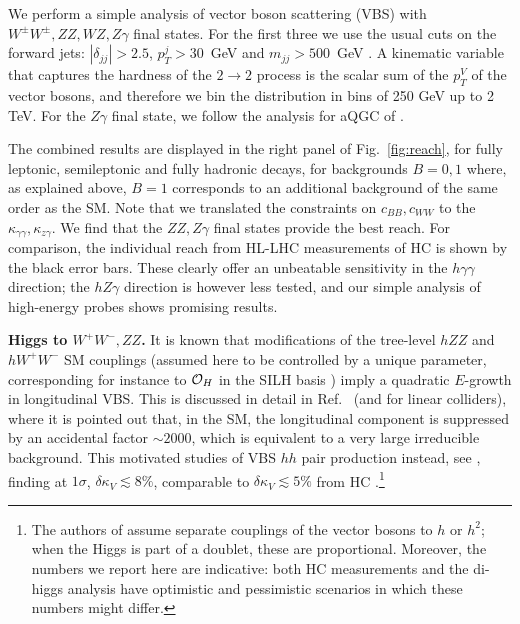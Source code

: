 We perform a simple analysis of vector boson scattering (VBS) with $W^\pm W^\pm, ZZ, WZ,Z\gamma$ final states. For the first three we use the usual cuts on the forward jets: $|\delta_{jj}|>2.5$, $p_T^j>30$~GeV and $m_{jj}>500$~GeV \cite{Aad:2014zda}. A kinematic variable that captures the hardness of the $2\to 2$ process is the scalar sum of the $p_T^V$ of the vector bosons, and therefore we bin the distribution in bins of 250 GeV up to 2 TeV. For the $Z\gamma$ final state, we follow the analysis for aQGC of \cite{Aaboud:2017pds}.

The combined results are displayed in the right panel of Fig.~\ref{fig:reach}, for fully leptonic, semileptonic and fully hadronic decays, for backgrounds  $B=0,1$ where, as explained above, $B=1$ corresponds to an additional background of the same order as the SM. Note that we translated the constraints on $c_{BB},c_{WW}$ to the $\kappa_{\gamma\gamma},\kappa_{z\gamma}$. We find that the $ZZ,Z\gamma$ final states provide the best reach.
For comparison, the individual reach from HL-LHC measurements of HC \cite{HLHEReport} is shown by the black error bars. These clearly offer an unbeatable sensitivity in the $h\gamma\gamma$ direction; the $hZ\gamma$ direction is however less tested, and our simple analysis of high-energy probes shows promising results.



\vspace{5mm}
\noindent
{\bf Higgs to $W^+W^-,ZZ$.}
It is  known that modifications of the tree-level $hZZ$ and $hW^+W^-$ SM couplings (assumed here to be controlled by a unique parameter, corresponding for instance to $\mathcal{O}_H$ in the SILH basis \cite{Giudice:2007fh}) imply a quadratic $E$-growth in longitudinal VBS. This is discussed in detail in Ref.~\cite{Contino:2010mh} (and \cite{Contino:2013gna} for linear colliders), where it is pointed out that, in the SM, the longitudinal component is suppressed by an accidental factor $\sim 2000$, which is equivalent to a very large irreducible background. This motivated studies of VBS $hh$ pair production instead, see \cite{Bishara:2016kjn}, finding at $1\sigma$, $\delta\kappa_V\lesssim 8\%$, comparable to $\delta\kappa_V\lesssim 5\%$ from HC \cite{HLHEReport}.\footnote{The authors of \cite{Bishara:2016kjn} assume separate couplings of the vector bosons to $h$ or $h^2$; when the Higgs is part of a doublet, these are proportional. Moreover, the numbers we report here are indicative: both HC measurements and the di-higgs analysis have  optimistic and pessimistic scenarios in which these numbers might differ.}




